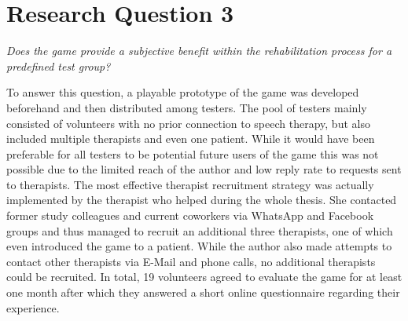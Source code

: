 \documentclass[draft,final]{vutinfth} %
\begin{document}
\section{Research Question 3}
\begin{center}
\emph{Does the game provide a subjective benefit within the rehabilitation process for a predefined test group?}
\end{center} 

To answer this question, a playable prototype of the game was developed beforehand and then distributed among testers. The pool of testers mainly consisted of volunteers with no prior connection to speech therapy, but also included multiple therapists and even one patient. While it would have been preferable for all testers to be potential future users of the game this was not possible due to the limited reach of the author and low reply rate to requests sent to therapists. The most effective therapist recruitment strategy was actually implemented by the therapist who helped during the whole thesis. She contacted former study colleagues and current coworkers via WhatsApp and Facebook groups and thus managed to recruit an additional three therapists, one of which even introduced the game to a patient. While the author also made attempts to contact other therapists via E-Mail and phone calls, no additional therapists could be recruited. In total, 19 volunteers agreed to evaluate the game for at least one month after which they answered a short online questionnaire regarding their experience. \\
\end{document}
